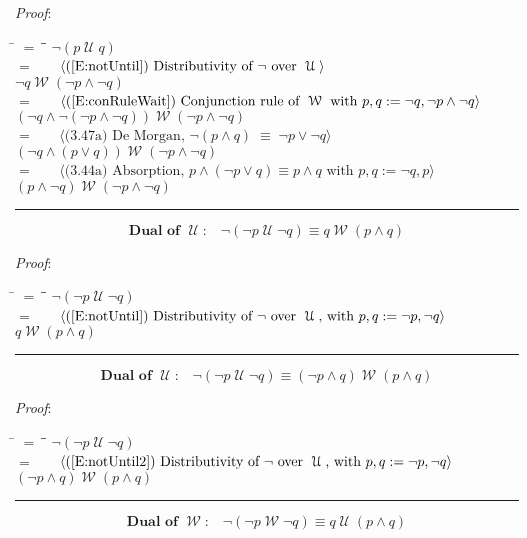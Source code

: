 \documentclass[12pt, fleqn, leqno]{article}
\newcommand{\lgap}{2pt}                             %
\newcommand{\mymathindent}{24pt}                    %
\newcommand{\equivs}{\ensuremath{\;\equiv\;}}       %
\newcommand{\Until}{\;\mathcal{U}\;}
\newcommand{\Wait}{\;\mathcal{W}\;}
\newcommand{\myqed}{\rule[-.23ex]{1.2ex}{2.0ex}}
\newcommand{\myqedtab}{\hspace{384pt}}              %
\newcommand{\Gll} {\langle}                         %
\newcommand{\Ggg} {\rangle}                         %
\newcommand{\Hint}[1]     {\ \ \ $\Gll              \mbox{#1} \Ggg$ }   %
\begin{document}
\emph{Proof}:
\begin{tabbing}
\hspace{\mymathindent} \= $= \;$ \= \myqedtab \= \kill
\> \> $\neg (p\Until q)$\\[\lgap]
\> $=$ \> \Hint{(\ref{E:notUntil}) Distributivity of $\neg$ over $\Until$} \\[\lgap]
\> \> $\neg q \Wait (\neg p \land \neg q)$\\[\lgap]
\> $=$ \> \Hint{(\ref{E:conRuleWait}) Conjunction rule of $\Wait$ with $p,q:=\neg q, \neg p\land\neg q$} \\[\lgap]
\> \> $(\neg q \land \neg(\neg p \land \neg q)) \Wait (\neg p \land \neg q)$\\[\lgap]
\> $=$  \>  \Hint{(3.47a) De Morgan, $\neg(p\land q)\equivs \neg p\lor\neg q$}\\[\lgap]
\> \> $(\neg q \land (p \lor q)) \Wait (\neg p \land \neg q)$\\[\lgap]
\> $=$ \> \Hint{(3.44a) Absorption, $p\land (\neg p\lor q)\equiv p\land q$ with $p,q:=\neg q,p$} \\[\lgap]
\> \> $(p \land \neg q) \Wait (\neg p \land \neg q)$ \quad \myqed
\end{tabbing}
\begin{equation}\label{E:DualUntil1}
\textbf{Dual of $\Until$:}\quad \neg (\neg p \Until \neg q) \equiv q \Wait (p \land q)
\end{equation}

\emph{Proof}:
\begin{tabbing}
\hspace{\mymathindent} \= $= \;$ \= \myqedtab \= \kill
\> \> $\neg (\neg p \Until \neg q)$\\[\lgap]
\> $=$ \> \Hint{(\ref{E:notUntil}) Distributivity of $\neg$ over $\Until$, with $p,q := \neg p, \neg q$} \\[\lgap]
\> \> $q \Wait (p \land q)$ \quad \myqed
\end{tabbing}
\begin{equation}\label{E:DualUntil2}
\textbf{Dual of $\Until$:}\quad \neg (\neg p \Until \neg q) \equiv ( \neg p \land q) \Wait (p \land q)
\end{equation}

\emph{Proof}:
\begin{tabbing}
\hspace{\mymathindent} \= $= \;$ \= \myqedtab \= \kill
\> \> $\neg (\neg p \Until \neg q)$\\[\lgap]
\> $=$ \> \Hint{(\ref{E:notUntil2}) Distributivity of $\neg$ over $\Until$, with $p,q := \neg p, \neg q$} \\[\lgap]
\> \> $( \neg p \land q) \Wait (p \land q)$ \quad \myqed
\end{tabbing}
\begin{equation}\label{E:DualWait1}
\textbf{Dual of $\Wait$:}\quad \neg (\neg p \Wait \neg q) \equiv q \Until (p \land q)
\end{equation}
\end{document}
